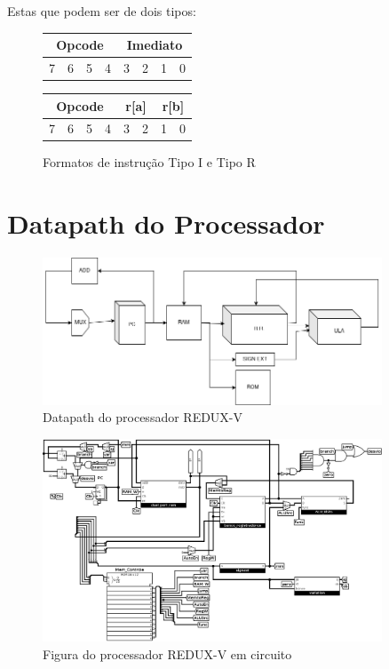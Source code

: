 \documentclass[12pt]{article}
\begin{document}
Estas que podem ser de dois tipos:

\begin{figure}[H]
\centering
\begin{minipage}{0.45\textwidth}
\centering
\begin{tabular}{|c|c|c|c|c|c|c|c|}
\hline
\multicolumn{4}{|c|}{Opcode} & \multicolumn{4}{c|}{Imediato} \\ \hline
7 & 6 & 5 & 4 & 3 & 2 & 1 & 0 \\ \hline
\end{tabular}
\end{minipage}
\hfill
\begin{minipage}{0.45\textwidth}
\centering
\begin{tabular}{|c|c|c|c|c|c|c|c|}
\hline
\multicolumn{4}{|c|}{Opcode} & \multicolumn{2}{c|}{r[a]} & \multicolumn{2}{c|}{r[b]} \\ \hline
7 & 6 & 5 & 4 & 3 & 2 & 1 & 0 \\ \hline
\end{tabular}
\end{minipage}
\caption{Formatos de instrução Tipo I e Tipo R}
\label{fig:instruction_formats}
\end{figure}

\section{Datapath do Processador}

\begin{figure}[H]
\centering
\includegraphics[width=0.9\textwidth]{images/Redux-V_datapath3.drawio.png}
\caption{Datapath do processador REDUX-V}
\label{fig:datapath}
\end{figure}

\begin{figure}[H]
\centering
\includegraphics[width=0.9\textwidth]{images/Redux-V_datapath_2.png}
\caption{Figura do processador REDUX-V em circuito}
\label{fig:circuit}
\end{figure}
\end{document}
